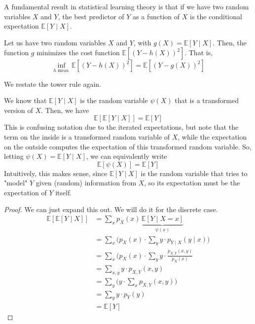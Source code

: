   A fundamental result in statistical learning theory is that if we have two random variables $X$ and $Y$, the best predictor of $Y$ as a function of $X$ is the conditional expectation $\mathbb{E}[Y \mid X]$. 

  \begin{theorem}
    Let us have two random variables $X$ and $Y$, with $g(X) = \mathbb{E}[Y \mid X]$. Then, the function $g$ minimizes the cost function $\mathbb{E}[ (Y - h(X))^2]$. That is, 
    \begin{equation}
      \inf_{h \text{ meas.}} \mathbb{E}[( Y - h(X))^2] = \mathbb{E} [(Y - g(X))^2]
    \end{equation}
  \end{theorem}

  We restate the tower rule again. 

  \begin{theorem}
    We know that $\mathbb{E}[Y \mid X]$ is the random variable $\psi(X)$ that is a transformed version of $X$. Then, we have
    \begin{equation}
      \mathbb{E}[ \mathbb{E}[Y \mid X]] = \mathbb{E}[Y]
    \end{equation}
    This is confusing notation due to the iterated expectations, but note that the term on the inside is a transformed random variable of $X$, while the expectation on the outside computes the expectation of this transformed random variable. So, letting $\psi(X) = \mathbb{E}[Y \mid X]$, we can equivalently write 
    \begin{equation}
      \mathbb{E}[ \psi(X)] = \mathbb{E}[Y]
    \end{equation}
    Intuitively, this makes sense, since $\mathbb{E}[Y \mid X]$ is the random variable that tries to "model" $Y$ given (random) information from $X$, so its expectation must be the expectation of $Y$ itself. 
  \end{theorem}
  \begin{proof}
    We can just expand this out. We will do it for the discrete case. 
    \begin{align*}
      \mathbb{E}[ \mathbb{E}[Y \mid X]] & = \sum_x p_X (x) \, \underbrace{\mathbb{E}[Y \mid X = x]}_{\psi(x)} \\
      & = \sum_x \bigg( p_X (x) \cdot \sum_y y \cdot p_{Y \mid X} (y \mid x) \bigg) \\
      & = \sum_x \bigg( p_X (x) \cdot \sum_y y \cdot \frac{p_{X, Y} (x, y)}{p_X (x)} \\
      & = \sum_{x, y} y \cdot p_{X, Y} (x, y) \\
      & = \sum_y \bigg( y \cdot \sum_x p_{X, Y} (x, y) \bigg) \\
      & = \sum_y y \cdot p_Y (y) \\
      & = \mathbb{E}[Y]
    \end{align*}
  \end{proof}

